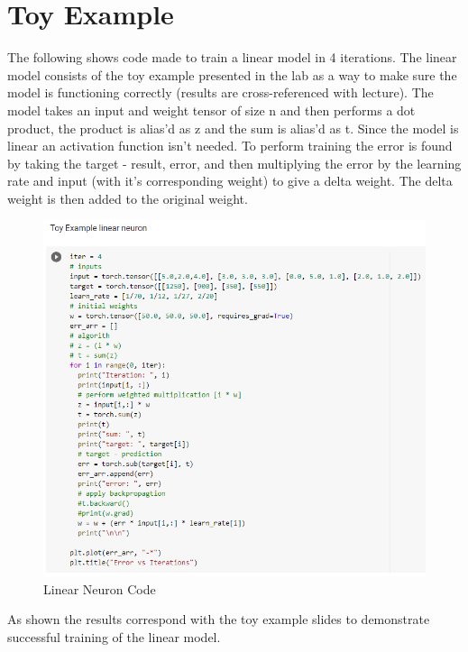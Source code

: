 \documentclass[24pt, letterpaper]{article}
\begin{document}
	\section{Toy Example}
	The following shows code made to train a linear model in 4 iterations. The linear model consists of the toy example presented in the lab as a way to make sure the model is functioning correctly (results are cross-referenced with lecture). The model takes an input and weight tensor of size n and then performs a dot product, the product is alias'd as z and the sum is alias'd as t. Since the model is linear an activation function isn't needed. To perform training the error is found by taking the target - result, error, and then multiplying the error by the learning rate and input (with it's corresponding weight) to give a delta weight. The delta weight is then added to the original weight.
		\begin{figure}[hb!]
			\centering
			\includegraphics[width=0.7\linewidth]{Lab1Img/Linear_Code}
			\caption{Linear Neuron Code}
			\label{fig:Linear Code}
		\end{figure}
		\FloatBarrier	
	As shown the results correspond with the toy example slides to demonstrate successful training of the linear model.
\end{document}
